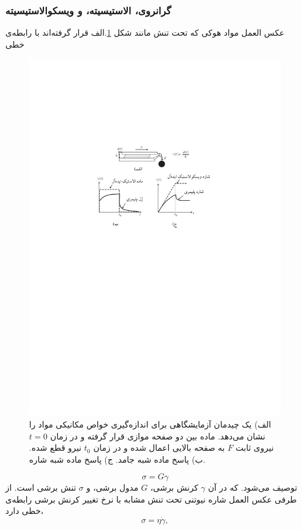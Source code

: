 \subsubsection{گرانروی، الاستیسیته،  و ویسکوالاستیسیته}
عکس العمل مواد هوکی که تحت تنش مانند شکل \ref{fig:3.2}.الف قرار گرفته‌اند  با رابطه‌ی خطی 
\begin{figure}[htbp]
\begin{center}
\includegraphics[width=5in]{Figs/Fig3_2}
\caption{
الف) یک چیدمان آزمایشگاهی برای اندازه‌گیری خواص مکانیکی مواد را نشان می‌دهد. ماده بین دو صفحه موازی قرار گرفته و در زمان $t=0$  نیروی ثابت $F$ به صفحه بالایی اعمال شده و در زمان $t_0$ نیرو قطع شده‌. ب) پاسخ ماده شبه جامد. ج) پاسخ ماده شبه شاره.
}
\label{fig:3.2}
\end{center}
\end{figure}


\begin{equation}
\sigma=G\gamma
\label{eq:elastic}
\end{equation}
توصیف می‌شود. که در آن $\gamma$ کرنش برشی، $G$ مدول برشی، و $\sigma$ تنش برشی است. از طرفی عکس العمل شاره نیوتنی تحت تنش مشابه با نرخ تغییر کرنش برشی رابطه‌ی خطی دارد،
\begin{equation}
\sigma=\eta\dot\gamma,
\label{eq:visco}
\end{equation}

